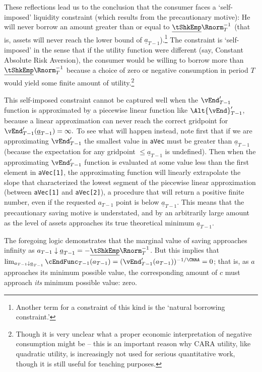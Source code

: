\documentclass[titlepage]{\econtex}
\begin{document}
These reflections lead us to the conclusion that the consumer faces a
`self-imposed' liquidity constraint (which results from the
precautionary motive): He will never borrow an amount greater
than or equal to $\underline{\tShkEmp}\Rnorm_{T}^{-1}$ (that is,
assets will never reach the lower bound of
$\underline{a}_{T-1}$).\footnote{Another term for a constraint of this
  kind is the `natural borrowing constraint.'}  The constraint is
`self-imposed' in the sense that if the utility function were
different (say, Constant Absolute Risk Aversion), the consumer would
be willing to borrow more than $\underline{\tShkEmp}\Rnorm_{T}^{-1}$
because a choice of zero or negative consumption in period $T$ would
yield some finite amount of utility.\footnote{Though it is very unclear what a
proper economic interpretation of negative consumption might be --
this is an important reason why CARA utility, like quadratic utility,
is increasingly not used for serious quantitative work, though it is
still useful for teaching purposes.}

This self-imposed constraint cannot be captured well when the
$\vEnd^{\prime}_{T-1}$ function is approximated by a piecewise
linear function like $\Alt{\vEnd}^{\prime}_{T-1}$, because a
linear approximation can never reach the correct gridpoint for
$\vEnd^{\prime}_{T-1}(\underline{a}_{T-1})=\infty.$ To see what
will happen instead, note first that if we are approximating $\vEnd^{\prime}_{T-1}$ the smallest value in
\texttt{aVec} must be greater than $\underline{a}_{T-1}$
(because the expectation for any gridpoint $\leq \underline{a}_{T-1}$ is undefined).  Then when the
approximating $\vEnd^{\prime}_{T-1}$ function is evaluated at
some value less than the first element in \texttt{aVec[1]}, the
approximating function will linearly extrapolate the slope that
characterized the lowest segment of the piecewise linear approximation
(between \texttt{aVec[1]} and \texttt{aVec[2]}), a
procedure that will return a positive finite number, even if the
requested ${a}_{T-1}$ point is below $\underline{a}_{T-1}$.  This means that the
precautionary saving motive is understated, and by an arbitrarily
large amount as the level of assets approaches its true theoretical
minimum $\underline{a}_{T-1}$.

The foregoing logic demonstrates that the marginal value of saving approaches infinity as ${a}_{T-1} \downarrow
\underline{a}_{T-1}=-\underline{\tShkEmp}\Rnorm_{T}^{-1}$.  But this
implies that $\lim_{{a}_{T-1} \downarrow \underline{a}_{T-1}}
\cEndFunc_{T-1}({a}_{T-1}) = (\vEnd_{T-1}^{\prime}({a}_{T-1}))^{-1/\CRRA} = 0$;
that is, as ${a}$ approaches its minimum possible value, the
corresponding amount of ${c}$ must approach \textit{its} minimum possible value: zero.
\end{document}
